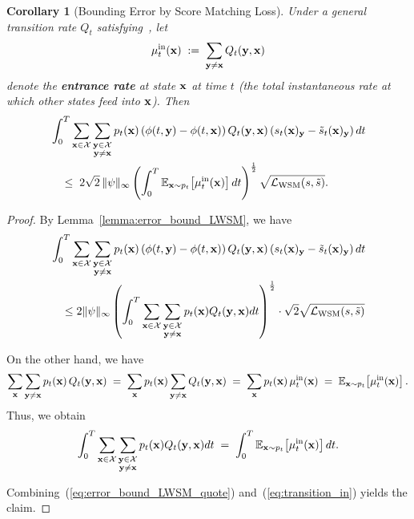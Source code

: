 \documentclass{article} %
\newtheorem{corollary}[theorem]{Corollary}
\def\eqref#1{equation~\ref{#1}}
\newcommand{\bfx}{{\bf x}}
\newcommand{\bfy}{ {\bf y}}
\newcommand{\LWSM}{\mathcal{L}_{\mathrm{WSM}}}
\renewcommand{\eqref}[1]{\textup{(\ref{#1})}}
\begin{document}
\begin{corollary}[Bounding Error by Score Matching Loss]\label{cor:error_bound_LWSM}
Under a general transition rate $Q_t$ satisfying~, let
\[
  \mu^\mathrm{in}_t(\bfx) \;:=\; \sum_{\bfy \neq \bfx} Q_t(\bfy, \bfx)
\]
denote the \textbf{entrance rate} at state $\bfx$ at time $t$ (the total instantaneous 
rate at which other states feed into $\bfx$). Then
\begin{align*}
  & \int_0^T \sum_{\bfx\in\mathcal{X}} \sum_{\substack{\bfy\in\mathcal{X} \\ \bfy\neq \bfx}} 
    p_t(\bfx) \left(\phi(t, \bfy)-\phi(t, \bfx) \right) Q_t(\bfy, \bfx) 
    \left( s_t(\bfx)_\bfy - \tilde{s}_t(\bfx)_\bfy \right) dt  \\
  &\quad\leq\; 2\sqrt{2}\, \| \psi\|_\infty 
    \left( \int_0^T \mathbb{E}_{\bfx \sim p_t}\!\left[ \mu^\mathrm{in}_t(\bfx) \right] dt \right)^{\frac{1}{2}}
    \sqrt{\LWSM(s, \tilde{s})}.
\end{align*}
\end{corollary}

\begin{proof}
By Lemma~\ref{lemma:error_bound_LWSM}, we have
\begin{align}\label{eq:error_bound_LWSM_quote}
\begin{split}
        & \int_0^T \sum_{\substack{\bfx\in\mathcal{X}}} \sum_{\substack{\bfy\in\mathcal{X} \\ \bfy\neq \bfx}}  p_t(\bfx) \left(\phi(t, \bfy)-\phi(t, \bfx) \right) Q_t(\bfy, \bfx) \left( s_t(\bfx)_\bfy - \tilde{s}_t(\bfx)_\bfy \right)  dt \\ &\quad \leq 2 \| \psi \|_\infty \left(\int_0^T \sum_{\substack{\bfx\in\mathcal{X}}} \sum_{\substack{\bfy\in\mathcal{X} \\\bfy\neq \bfx}} p_t(\bfx)  Q_t(\bfy, \bfx)  dt\right)^{\frac{1}{2}} \cdot \sqrt{2} \sqrt{\LWSM(s, \tilde{s})}
    \end{split}
    \end{align}

\smallskip
On the other hand, we have
\[
  \sum_{\bfx} \sum_{\bfy \neq \bfx} p_t(\bfx)\,Q_t(\bfy, \bfx)
  \;=\; \sum_{\bfx} p_t(\bfx) \sum_{\bfy \neq \bfx} Q_t(\bfy, \bfx)
  \;=\; \sum_{\bfx} p_t(\bfx)\,\mu^\mathrm{in}_t(\bfx)
  \;=\; \mathbb{E}_{\bfx \sim p_t}\!\left[ \mu^\mathrm{in}_t(\bfx) \right].
\]
Thus, we obtain
\begin{equation}\label{eq:transition_in}
  \int_0^T \sum_{\substack{\bfx\in\mathcal{X}}} \sum_{\substack{\bfy\in\mathcal{X} \\\bfy\neq \bfx}} p_t(\bfx)  Q_t(\bfy, \bfx)  dt  \;=\; 
      \int_0^T \mathbb{E}_{\bfx \sim p_t}\!\left[ \mu^\mathrm{in}_t(\bfx) \right] dt .
\end{equation}
\smallskip

Combining~\eqref{eq:error_bound_LWSM_quote} and~\eqref{eq:transition_in} yields the claim.
\end{proof}
\end{document}
